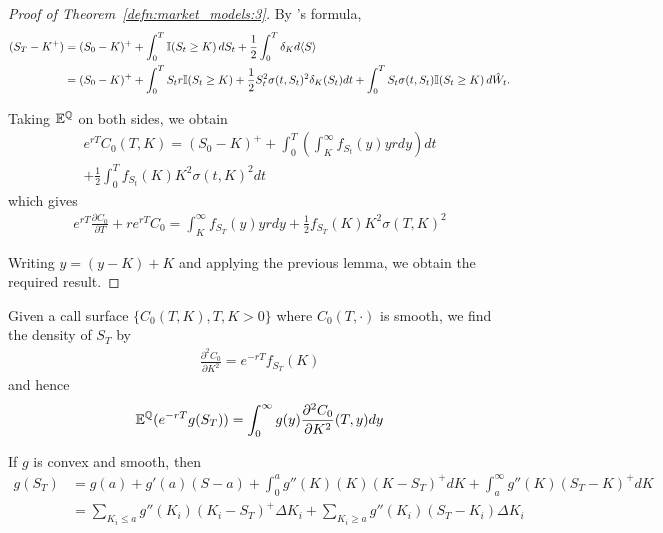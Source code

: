 \begin{proof}[Proof of Theorem~\ref{defn:market_models:3}]
  By \ito's formula,
  \begin{align}
    \label{eq:108}
    (S_{T} - K^{+}) &= (S_{0} - K)^{+} + \int_{0}^{T} \I{S_{t} \geq K}
    dS_{t} + \frac{1}{2} \int_{0}^{T} \delta_{K} d \IP{S} \\
    &= (S_{0} - K)^{+} + \int_{0}^{T} S_{t} r \I{S_{t} \geq K} +
    \frac{1}{2} S_{t}^{2} \sigma(t, S_{t})^{2} \delta_{K}(S_{t}) dt + 
    \int_{0}^{T} S_{t} \sigma(t, S_{t}) \I{S_{t} \geq K} d\hat W_{t}.
  \end{align}

  Taking $\mathbb{E}^{\Q}$ on both sides, we obtain
  \begin{multline}
    \label{eq:109}
    e^{rT}C_{0}(T, K) = (S_{0} - K)^{+} + \int_{0}^{T}
    \left( \int_{K}^{\infty} f_{S_{t}}(y) y r dy \right) dt \\
    + \frac{1}{2} \int_{0}^{T} f_{S_{t}}(K) K^{2} \sigma(t, K)^{2} dt
  \end{multline} which gives
  \begin{align}
    \label{eq:110}
    e^{rT} \frac{\partial C_{0}}{\partial T} + re^{rT}C_{0} =
    \int_{K}^{\infty} f_{S_{T}}(y) y r dy + \frac{1}{2} f_{S_{T}}(K)
    K^{2} \sigma(T, K)^{2}
  \end{align}

  Writing $y = (y - K) + K$ and applying the previous lemma, we obtain
  the required result.
\end{proof}

\begin{remark}
  Given a call surface $\{ C_{0}(T, K), T, K > 0 \}$ where $C_{0}(T,
  \cdot)$ is smooth, we find the density of $S_{T}$ by
  \begin{align}
    \label{eq:111}
    \frac{\partial^{2} C_{0}}{\partial K^{2}} = e^{-rT} f_{S_{T}}(K)
  \end{align} and hence
  \begin{align}
    \label{eq:112}
    \mathbb{E}^{\Q}(e^{-rT} g(S_{T})) = \int_{0}^{\infty} g(y)
    \frac{\partial^{2} C_{0}}{\partial K^{2}}(T, y) dy
  \end{align}

  If $g$ is convex and smooth, then
  \begin{align}
    \label{eq:113}
    g(S_{T}) &= g(a) + g'(a)(S-a) + \int_{0}^{a} g''(K) (K) (K -
    S_{T})^{+} dK + \int_{a}^{\infty} g''(K) (S_{T} - K)^{+} dK \\
    &= \sum_{K_{i} \leq a} g''(K_{i})(K_{i} - S_{T})^{+} \Delta K_{i}
    + \sum_{K_{i} \geq a} g''(K_{i}) (S_{T} - K_{i}) \Delta K_{i}
  \end{align}
\end{remark}

